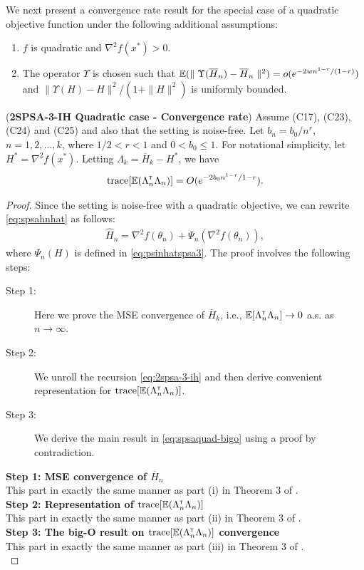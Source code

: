 We next present a convergence rate result for the special case of a quadratic objective function under the following additional assumptions:
\begin{enumerate}[label=(\textbf{C\arabic*}),resume]
\item  $f$ is quadratic and $\nabla^2 f(x^*) > 0$. 
\item The operator $\Upsilon$ is chosen such that $\mathbb{E}(\parallel \Upsilon(\overline H_n) - \overline H_n\parallel^2) = o(e^{-2wn^{1-r}/(1-r)})$ and $\parallel \Upsilon(H) - H \parallel^2 / (1+\parallel H \parallel^2)$ is uniformly bounded.
\end{enumerate}
\begin{theorem}(\textbf{2SPSA-3-IH Quadratic case - Convergence rate})
\label{thm:spsaquad-bound}
Assume (C17), (C23), (C24) and (C25) and also that the setting is noise-free. 
Let $b_n = b_0/n^r$, $n=1,2,\ldots,k$, where $1/2 < r < 1$ and $0 < b_0 \leq 1$. For notational simplicity, let $H^*=\nabla^2 f(x^*)$. Letting $\Lambda_k = \overline H_k - H^*$, we have 
\begin{align}
\text{trace}[\mathbb{E} (\Lambda_n ^\mathsf{\scriptscriptstyle T} \Lambda_n)] = O(e^{-2b_0n^{1-r} / {1-r}}).
\label{eq:spsaquad-bigo}
\end{align}
\end{theorem}
\begin{proof}
Since the setting is noise-free with a quadratic objective, we can rewrite \eqref{eq:spsahnhat} as follows:
\begin{align}
 \widehat H_n =    \nabla^2 f(\theta_n) +\Psi_{n}(\nabla^2 f(\theta_n)),\label{eq:spsahnhat-ext}
\end{align}
where $\Psi_n(H)$ is defined in \eqref{eq:psinhatspsa3}.
The proof involves the following steps:
\begin{description}
  \item[Step 1:] Here we prove the MSE convergence of $\overline H_k$, i.e., $\mathbb{E} [\Lambda_n^\mathsf{\scriptscriptstyle T} \Lambda_n] \rightarrow 0$ a.s. as $n\rightarrow \infty$.
  \item[Step 2:] We unroll the recursion \eqref{eq:2spsa-3-ih} and then derive convenient representation for $\text{trace}[\mathbb{E} (\Lambda_n ^\mathsf{\scriptscriptstyle T} \Lambda_n)]$.
  \item[Step 3:] We derive the main result in \eqref{eq:spsaquad-bigo} using a proof by contradiction. 
\end{description}
\noindent\textbf{Step 1: MSE convergence of $\overline H_n$} \\
This part in exactly the same manner as part (i) in Theorem 3 of \cite{spall-jacobian}.\\
\noindent\textbf{Step 2: Representation of $\text{trace}[\mathbb{E} (\Lambda_n ^\mathsf{\scriptscriptstyle T} \Lambda_n)]$} \\
This part in exactly the same manner as part (ii) in Theorem 3 of \cite{spall-jacobian}.\\
\noindent\textbf{Step 3: The big-O result on $\text{trace}[\mathbb{E} (\Lambda_n ^\mathsf{\scriptscriptstyle T} \Lambda_n)]$ convergence} \\
This part in exactly the same manner as part (iii) in Theorem 3 of \cite{spall-jacobian}.\\
\end{proof}



